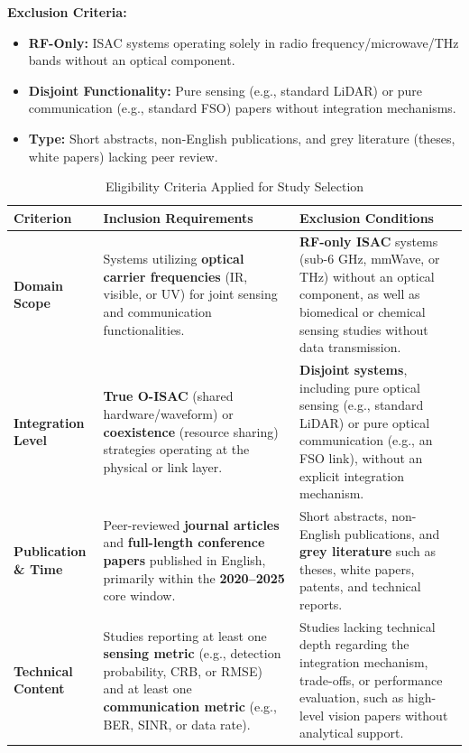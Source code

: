 \documentclass[lettersize,journal]{IEEEtran}
\begin{document}
\textbf{Exclusion Criteria:}
\begin{itemize}
    \item \textbf{RF-Only:} ISAC systems operating solely in radio frequency/microwave/THz bands without an optical component.
    \item \textbf{Disjoint Functionality:} Pure sensing (e.g., standard LiDAR) or pure communication (e.g., standard FSO) papers without integration mechanisms.
    \item \textbf{Type:} Short abstracts, non-English publications, and grey literature (theses, white papers) lacking peer review.
\end{itemize}

\begin{table}[!t]
\caption{Eligibility Criteria Applied for Study Selection}
\label{tab:iii1}
\centering
\footnotesize
\begin{tabularx}{\textwidth}{@{}>{\raggedright\arraybackslash}p{2.1cm} >{\raggedright\arraybackslash}X >{\raggedright\arraybackslash}X@{}}
\toprule
\textbf{Criterion} &
\textbf{Inclusion Requirements} &
\textbf{Exclusion Conditions} \\
\midrule

\textbf{Domain Scope} &
Systems utilizing \textbf{optical carrier frequencies} (IR, visible, or UV) for joint sensing and communication functionalities. &
\textbf{RF-only ISAC} systems (sub-6 GHz, mmWave, or THz) without an optical component, as well as biomedical or chemical sensing studies without data transmission. \\

\textbf{Integration Level} &
\textbf{True O-ISAC} (shared hardware/waveform) or \textbf{coexistence} (resource sharing) strategies operating at the physical or link layer. &
\textbf{Disjoint systems}, including pure optical sensing (e.g., standard LiDAR) or pure optical communication (e.g., an FSO link), without an explicit integration mechanism. \\

\textbf{Publication \& Time} &
Peer-reviewed \textbf{journal articles} and \textbf{full-length conference papers} published in English, primarily within the \textbf{2020--2025} core window. &
Short abstracts, non-English publications, and \textbf{grey literature} such as theses, white papers, patents, and technical reports. \\

\textbf{Technical Content} &
Studies reporting at least one \textbf{sensing metric} (e.g., detection probability, CRB, or RMSE) and at least one \textbf{communication metric} (e.g., BER, SINR, or data rate). &
Studies lacking technical depth regarding the integration mechanism, trade-offs, or performance evaluation, such as high-level vision papers without analytical support. \\
\bottomrule
\end{tabularx}
\end{table}
\end{document}
